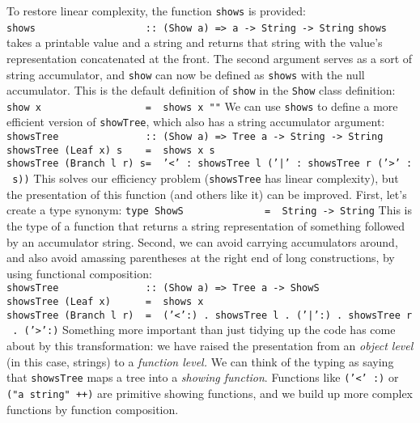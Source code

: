 To restore linear complexity, the function \mbox{\tt shows} is provided:
\bprog
\mbox{\tt shows\ \ \ \ \ \ \ \ \ \ \ \ \ \ \ \ \ \ \ ::\ (Show\ a)\ =>\ a\ ->\ String\ ->\ String}
\eprog
\mbox{\tt shows} takes a printable value and a string and returns
that string with the value's representation concatenated
at the front.  The second argument serves as a sort of string
accumulator, and \mbox{\tt show} can now be defined as \mbox{\tt shows} with
the null accumulator.  This is the default definition of
\mbox{\tt show} in the \mbox{\tt Show} class definition:
\bprog
\mbox{\tt show\ x\ \ \ \ \ \ \ \ \ \ \ \ \ \ \ \ \ \ =\ \ shows\ x\ ""}
\eprog
We can use \mbox{\tt shows} to define a more efficient version of \mbox{\tt showTree},
which also has a string accumulator argument:
\bprog
\mbox{\tt showsTree\ \ \ \ \ \ \ \ \ \ \ \ \ \ \ ::\ (Show\ a)\ =>\ Tree\ a\ ->\ String\ ->\ String}\\
\mbox{\tt showsTree\ (Leaf\ x)\ s\ \ \ \ =\ \ shows\ x\ s}\\
\mbox{\tt showsTree\ (Branch\ l\ r)\ s=\ \ '<'\ :\ showsTree\ l\ ('|'\ :\ showsTree\ r\ ('>'\ :\ s))}
\eprog
This solves our efficiency problem (\mbox{\tt showsTree} has linear complexity),
but the presentation of this function (and others like it) can be
improved.  First, let's create a type synonym:
\bprog
\mbox{\tt type\ ShowS\ \ \ \ \ \ \ \ \ \ \ \ \ \ =\ \ String\ ->\ String}
\eprog
This is the type of a function that returns a string representation of
something followed by an accumulator string.
Second, we can avoid carrying accumulators around, and also avoid
amassing parentheses at the right end of long constructions, by using
functional composition:
\bprog
\mbox{\tt showsTree\ \ \ \ \ \ \ \ \ \ \ \ \ \ \ ::\ (Show\ a)\ =>\ Tree\ a\ ->\ ShowS}\\
\mbox{\tt showsTree\ (Leaf\ x)\ \ \ \ \ \ =\ \ shows\ x}\\
\mbox{\tt showsTree\ (Branch\ l\ r)\ \ =\ \ ('<':)\ .\ showsTree\ l\ .\ ('|':)\ .\ showsTree\ r\ .\ ('>':)}
\eprog
Something more important than just tidying up the code has come about
by this transformation:  we have raised the presentation from an
{\em object level} (in this case, strings) to a {\em function level.}
We can think of the typing as saying that \mbox{\tt showsTree} maps a tree
into a {\em showing function}.  Functions like \mbox{\tt ('<'\ :)} or
\mbox{\tt ("a\ string"\ ++)} are primitive showing functions, and we build up
more complex functions by function composition.

